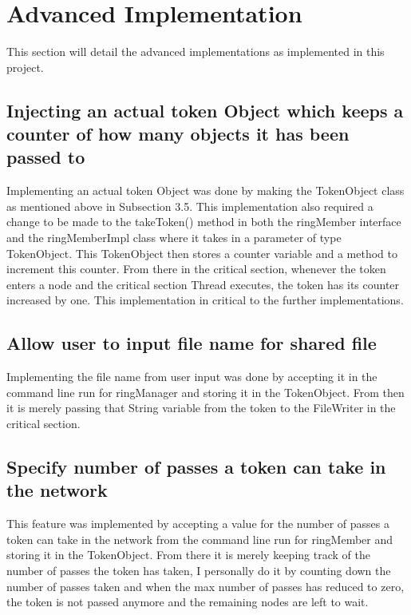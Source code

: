 \documentclass[11pt, a4paper]{article}
\begin{document}
\section{Advanced Implementation}
This section will detail the advanced implementations as implemented in this project.

\subsection{Injecting an actual token Object which keeps a counter of how many objects it has been passed to}

Implementing an actual token Object was done by making the TokenObject class as mentioned above in Subsection 3.5. This implementation also required a change to be made to the takeToken() method in both the ringMember interface and the ringMemberImpl class where it takes in a parameter of type TokenObject. This TokenObject then stores a counter variable and a method to increment this counter. From there in the critical section, whenever the token enters a node and the critical section Thread executes, the token has its counter increased by one. This implementation in critical to the further implementations. 

\subsection{Allow user to input file name for shared file}

Implementing the file name from user input was done by accepting it in the command line run for ringManager and storing it in the TokenObject. From then it is merely passing that String variable from the token to the FileWriter in the critical section. 

\subsection{Specify number of passes a token can take in the network}

This feature was implemented by accepting a value for the number of passes a token can take in the network from the command line run for ringMember and storing it in the TokenObject. From there it is merely keeping track of the number of passes the token has taken, I personally do it by counting down the number of passes taken and when the max number of passes has reduced to zero, the token is not passed anymore and the remaining nodes are left to wait.
\end{document}
